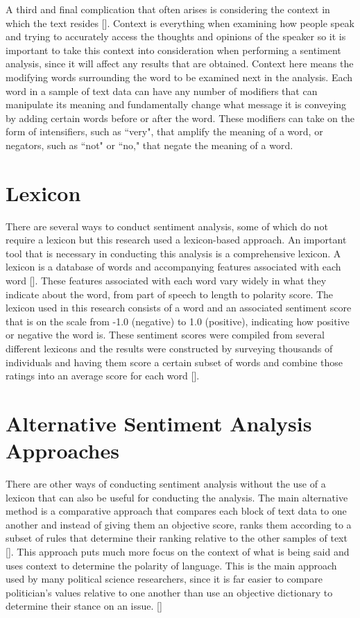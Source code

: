A third and final complication that often arises is considering the context in which the text resides [\cite{aggarwal2012mining}].
Context is everything when examining how people speak and trying to accurately access the thoughts and opinions of the speaker so it is important to take this context into consideration when performing a sentiment analysis, since it will affect any results that are obtained.
Context here means the modifying words surrounding the word to be examined next in the analysis.
Each word in a sample of text data can have any number of modifiers that can manipulate its meaning and fundamentally change what message it is conveying by adding certain words before or after the word.
These modifiers can take on the form of intensifiers, such as ``very", that amplify the meaning of a word, or negators, such as ``not" or ``no," that negate the meaning of a word.

\section{Lexicon}
There are several ways to conduct sentiment analysis, some of which do not require a lexicon but this research used a lexicon-based approach.
An important tool that is necessary in conducting this analysis is a comprehensive lexicon.
A lexicon is a database of words and accompanying features associated with each word [\cite{taboada2011lexicon}].
These features associated with each word vary widely in what they indicate about the word, from part of speech to length to polarity score.
The lexicon used in this research consists of a word and an associated sentiment score that is on the scale from -1.0 (negative) to 1.0 (positive), indicating how positive or negative the word is.
These sentiment scores were compiled from several different lexicons and the results were constructed by surveying thousands of individuals and having them score a certain subset of words and combine those ratings into an average score for each word [\cite{somasundaran2010lexicon}].

\section{Alternative Sentiment Analysis Approaches}
There are other ways of conducting sentiment analysis without the use of a lexicon that can also be useful for conducting the analysis.
The main alternative method is a comparative approach that compares each block of text data to one another and instead of giving them an objective score, ranks them according to a subset of rules that determine their ranking relative to the other samples of text [\cite{wilson2005contextual}].
This approach puts much more focus on the context of what is being said and uses context to determine the polarity of language.
This is the main approach used by many political science researchers, since it is far easier to compare politician's values relative to one another than use an objective dictionary to determine their stance on an issue. [\cite{laver2003extracting}]

